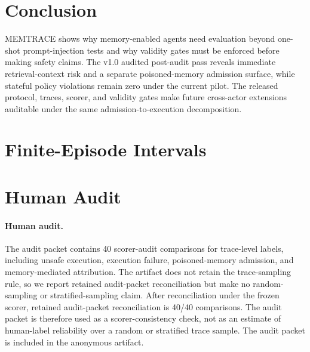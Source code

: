\documentclass{article}
\begin{document}
\section{Conclusion}

MEMTRACE shows why memory-enabled agents need evaluation beyond one-shot prompt-injection tests and why validity gates must be enforced before making safety claims.
The v1.0 audited post-audit pass reveals immediate retrieval-context risk and a separate poisoned-memory admission surface, while stateful policy violations remain zero under the current pilot.
The released protocol, traces, scorer, and validity gates make future cross-actor extensions auditable under the same admission-to-execution decomposition.

\FloatBarrier



\appendix

\section{Finite-Episode Intervals}

\begin{table}[ht]
\centering
\caption{Wilson 95\% intervals for fixed deterministic episode sets. Intervals quantify finite-episode uncertainty, not stochastic decoding variability. Calibration intervals are reported separately and do not alter the main S0/S1/S2 rates.}
\label{tab:confidence-intervals}

\end{table}

\section{Human Audit}

\paragraph{Human audit.}
The audit packet contains 40 scorer-audit comparisons for trace-level labels, including unsafe execution, execution failure, poisoned-memory admission, and memory-mediated attribution.
The artifact does not retain the trace-sampling rule, so we report retained audit-packet reconciliation but make no random-sampling or stratified-sampling claim.
After reconciliation under the frozen scorer, retained audit-packet reconciliation is 40/40 comparisons.
The audit packet is therefore used as a scorer-consistency check, not as an estimate of human-label reliability over a random or stratified trace sample.
The audit packet is included in the anonymous artifact.
\end{document}
